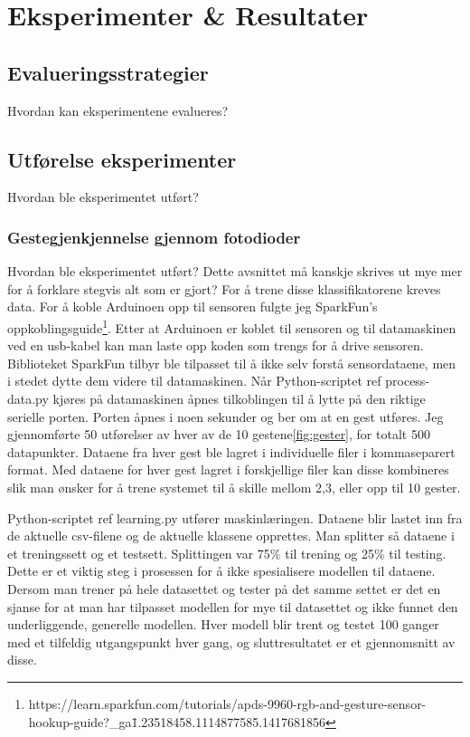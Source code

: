 \section[Eksperimenter \& Resultater]{Eksperimenter \& Resultater}
\subsection{Evalueringsstrategier}
{\color{red}Hvordan kan eksperimentene evalueres?}

\subsection{Utførelse eksperimenter}
{\color{red}Hvordan ble eksperimentet utført?}

\subsubsection*{Gestegjenkjennelse gjennom fotodioder}
{\color{red}Hvordan ble eksperimentet utført?}
{\color{red}Dette avsnittet må kanskje skrives ut mye mer for å forklare stegvis alt som er gjort?}
For å trene disse klassifikatorene kreves data. For å koble Arduinoen opp til sensoren fulgte jeg SparkFun's oppkoblingsguide\footnote{https://learn.sparkfun.com/tutorials/apds-9960-rgb-and-gesture-sensor-hookup-guide?\_ga\=1.23518458.1114877585.1417681856}. Etter at Arduinoen er koblet til sensoren og til datamaskinen ved en usb-kabel kan man laste opp koden som trengs for å drive sensoren. Biblioteket SparkFun tilbyr ble tilpasset til å ikke selv forstå sensordataene, men i stedet dytte dem videre til datamaskinen. Når Python-scriptet{\color{red} ref process-data.py} kjøres på datamaskinen åpnes tilkoblingen til å lytte på den riktige serielle porten. Porten åpnes i noen sekunder og ber om at en gest utføres. Jeg gjennomførte 50 utførelser av hver av de 10 gestene\ref{fig:gester}, for totalt 500 datapunkter. Dataene fra hver gest ble lagret i individuelle filer i kommaseparert format. Med dataene for hver gest lagret i forskjellige filer kan disse kombineres slik man ønsker for å trene systemet til å skille mellom 2,3, eller opp til 10 gester. 

Python-scriptet {\color{red} ref learning.py} utfører maskinlæringen. Dataene blir lastet inn fra de aktuelle csv-filene og de aktuelle klassene opprettes. Man splitter så dataene i et treningssett og et testsett. Splittingen var 75\% til trening og 25\% til testing. Dette er et viktig steg i prosessen for å ikke spesialisere modellen til dataene. Dersom man trener på hele datasettet og tester på det samme settet er det en sjanse for at man har tilpasset modellen for mye til datasettet og ikke funnet den underliggende, generelle modellen. Hver modell blir trent og testet 100 ganger med et tilfeldig utgangspunkt hver gang, og sluttresultatet er et gjennomsnitt av disse.

